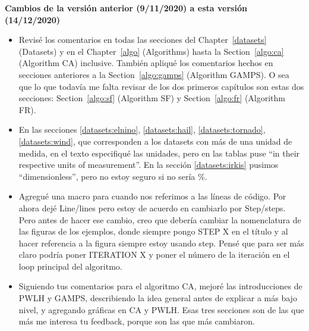 \clearpage
\textbf{Cambios de la versión anterior (9/11/2020) a esta versión (14/12/2020) }

\begin{itemize}

\item Revisé los comentarios en todas las secciones del Chapter~\ref{datasets} (Datasets) y en el Chapter~\ref{algo} (Algorithms) hasta la Section~\ref{algo:ca} (Algorithm CA) inclusive. También apliqué los comentarios hechos en secciones anteriores a la Section~\ref{algo:gamps} (Algorithm GAMPS). O sea que lo que todavía me falta revisar de los dos primeros capítulos son estas dos secciones: Section~\ref{algo:sf} (Algorithm SF) y Section~\ref{algo:fr} (Algorithm FR).

\item En las secciones \ref{datasets:elnino}, \ref{datasets:hail}, \ref{datasets:tornado}, \ref{datasets:wind}, que corresponden a los datasets con más de una unidad de medida, en el texto especifiqué las unidades, pero en las tablas puse ``in their respective units of measurement''. En la sección \ref{datasets:irkis} pusimos ``dimensionless'', pero no estoy seguro si no sería \%.

\item Agregué una macro para cuando nos referimos a las líneas de código. Por ahora dejé Line/lines pero estoy de acuerdo en cambiarlo por Step/steps. Pero antes de hacer ese cambio, creo que debería cambiar la nomenclatura de las figuras de los ejemplos, donde siempre pongo STEP X en el título y al hacer referencia a la figura siempre estoy usando step. Pensé que para ser más claro podría poner ITERATION X y poner el número de la iteración en el loop principal del algoritmo.

\item Siguiendo tus comentarios para el algoritmo CA, mejoré las introducciones de PWLH y GAMPS, describiendo la idea general antes de explicar a más bajo nivel, y agregando gráficas en CA y PWLH. Esas tres secciones son de las que más me interesa tu feedback, porque son las que más cambiaron. 

\end{itemize}